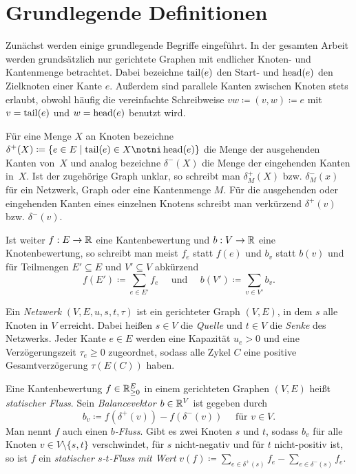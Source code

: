 
\section{Grundlegende Definitionen}

Zunächst werden einige grundlegende Begriffe eingeführt.
In der gesamten Arbeit werden grundsätzlich nur gerichtete Graphen mit endlicher Knoten- und Kantenmenge betrachtet.
Dabei bezeichne $\operatorname{tail}(e)$ den Start- und $\operatorname{head}(e)$ den Zielknoten einer Kante $e$.
Außerdem sind parallele Kanten zwischen Knoten stets erlaubt, obwohl häufig die vereinfachte Schreibweise $vw\coloneq (v,w)\coloneq e$ mit $v=\operatorname{tail}(e)$ und $w=\operatorname{head}(e)$ benutzt wird.

Für eine Menge $X$ an Knoten bezeichne $\delta^+(X)\coloneq \{ e\in E \mid \tail(e) \in X \notni \head(e) \}$ die Menge der ausgehenden Kanten von~$X$ und analog bezeichne $\delta^-(X)$ die Menge der eingehenden Kanten in~$X$.
Ist der zugehörige Graph unklar, so schreibt man $\delta^+_M(X)$ bzw. $\delta^-_M(x)$ für ein Netzwerk, Graph oder eine Kantenmenge $M$.
Für die ausgehenden oder eingehenden Kanten eines einzelnen Knotens schreibt man verkürzend $\delta^+(v)$ bzw. $\delta^-(v)$.

Ist weiter $f: E \rightarrow \mathbb{R}$ eine Kantenbewertung und $b: V \rightarrow \mathbb{R}$ eine Knotenbewertung, so schreibt man meist $f_e$ statt $f(e)$ und $b_v$ statt $b(v)$ und für Teilmengen $E'\subseteq E$ und $V'\subseteq V$ abkürzend
\[ 
	f(E')\coloneq \sum_{e \in E'} f_e \text{~~~ und ~~~} b(V')\coloneq\sum_{v\in V'} b_v.
\]

\begin{definition}
	Ein \emph{Netzwerk} $(V, E, u, s, t, \tau)$ ist ein gerichteter Graph $(V,E)$, in dem $s$ alle Knoten in $V$ erreicht.
	Dabei heißen $s\in V$ die \emph{Quelle} und $t\in V$ die \emph{Senke} des Netzwerks.
	Jeder Kante $e\in E$ werden eine Kapazität $u_e > 0$ und eine Verzögerungszeit $\tau_e\geq 0$ zugeordnet, sodass alle Zykel $C$ eine positive Gesamtverzögerung $\tau(E(C))$ haben.
\end{definition}
\begin{definition}
	Eine Kantenbewertung $f\in\mathbb{R}_{\geq 0}^E$ in einem gerichteten Graphen $(V, E)$ heißt \emph{statischer Fluss}.
	Sein \emph{Balancevektor $b\in \mathbb{R}^V$} ist gegeben durch
	\[ b_v \coloneq f(\delta^+(v)) - f(\delta^-(v)) \text{~~~ für $v\in V$}. \]
	Man nennt $f$ auch einen \emph{$b$-Fluss}.
	Gibt es zwei Knoten $s$ und $t$, sodass $b_v$
	für alle Knoten $v\in V\setminus\{ s, t \}$ verschwindet, für $s$ nicht-negativ und für $t$ nicht-positiv ist, so ist $f$ ein \emph{statischer $s$-$t$-Fluss mit Wert} $v(f)\coloneq\sum_{e\in\delta^+(s)} f_e - \sum_{e\in\delta^-(s)}f_e$.
\end{definition}

